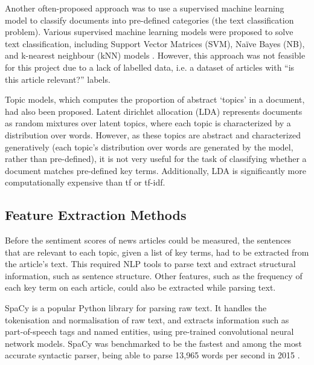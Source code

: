 \documentclass{report}
\begin{document}
Another often-proposed approach was to use a supervised machine learning model to classify documents into pre-defined categories (the text classification problem).
Various supervised machine learning models were proposed to solve text classification, including Support Vector Matrices (SVM), Na\"{i}ve Bayes (NB), and k-nearest neighbour (kNN) models \cite{khan2010review}.
However, this approach was not feasible for this project due to a lack of labelled data, i.e. a dataset of articles with ``is this article relevant?'' labels.

Topic models, which computes the proportion of abstract `topics' in a document, had also been proposed.
Latent dirichlet allocation (LDA) \cite{blei2003latent} represents documents as random mixtures over latent topics, where each topic is characterized by a distribution over words.
However, as these topics are abstract and characterized generatively (each topic's distribution over words are generated by the model, rather than pre-defined), it is not very useful for the task of classifying whether a document matches pre-defined key terms.
Additionally, LDA is significantly more computationally expensive than tf or tf-idf.

\subsection{Feature Extraction Methods} \label{tc-matching}
Before the sentiment scores of news articles could be measured, the sentences that are relevant to each topic, given a list of key terms, had to be extracted from the article's text.
This required NLP tools to parse text and extract structural information, such as sentence structure.
Other features, such as the frequency of each key term on each article, could also be extracted while parsing text.

SpaCy \cite{SpaCy} is a popular Python library for parsing raw text.
It handles the tokenisation and normalisation of raw text, and extracts information such as part-of-speech tags and named entities, using pre-trained convolutional neural network models.
SpaCy was benchmarked to be the fastest and among the most accurate syntactic parser, being able to parse 13,965 words per second in 2015 \cite{choi2015depends}.
\end{document}
